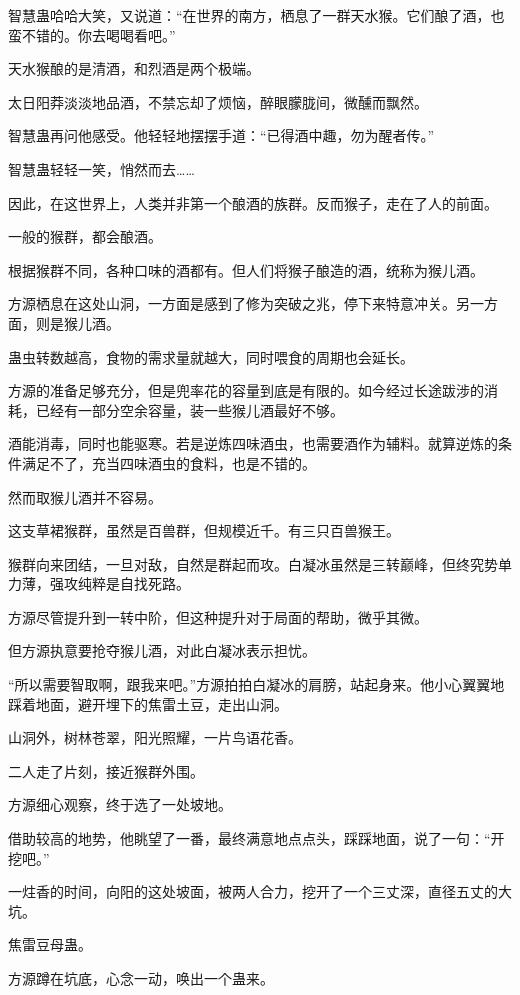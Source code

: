 \begin{this_body}
智慧蛊哈哈大笑，又说道：“在世界的南方，栖息了一群天水猴。它们酿了酒，也蛮不错的。你去喝喝看吧。”

天水猴酿的是清酒，和烈酒是两个极端。

太日阳莽淡淡地品酒，不禁忘却了烦恼，醉眼朦胧间，微醺而飘然。

智慧蛊再问他感受。他轻轻地摆摆手道：“已得酒中趣，勿为醒者传。”

智慧蛊轻轻一笑，悄然而去……

因此，在这世界上，人类并非第一个酿酒的族群。反而猴子，走在了人的前面。

一般的猴群，都会酿酒。

根据猴群不同，各种口味的酒都有。但人们将猴子酿造的酒，统称为猴儿酒。

方源栖息在这处山洞，一方面是感到了修为突破之兆，停下来特意冲关。另一方面，则是猴儿酒。

蛊虫转数越高，食物的需求量就越大，同时喂食的周期也会延长。

方源的准备足够充分，但是兜率花的容量到底是有限的。如今经过长途跋涉的消耗，已经有一部分空余容量，装一些猴儿酒最好不够。

酒能消毒，同时也能驱寒。若是逆炼四味酒虫，也需要酒作为辅料。就算逆炼的条件满足不了，充当四味酒虫的食料，也是不错的。

然而取猴儿酒并不容易。

这支草裙猴群，虽然是百兽群，但规模近千。有三只百兽猴王。

猴群向来团结，一旦对敌，自然是群起而攻。白凝冰虽然是三转巅峰，但终究势单力薄，强攻纯粹是自找死路。

方源尽管提升到一转中阶，但这种提升对于局面的帮助，微乎其微。

但方源执意要抢夺猴儿酒，对此白凝冰表示担忧。

“所以需要智取啊，跟我来吧。”方源拍拍白凝冰的肩膀，站起身来。他小心翼翼地踩着地面，避开埋下的焦雷土豆，走出山洞。

山洞外，树林苍翠，阳光照耀，一片鸟语花香。

二人走了片刻，接近猴群外围。

方源细心观察，终于选了一处坡地。

借助较高的地势，他眺望了一番，最终满意地点点头，踩踩地面，说了一句：“开挖吧。”

一炷香的时间，向阳的这处坡面，被两人合力，挖开了一个三丈深，直径五丈的大坑。

焦雷豆母蛊。

方源蹲在坑底，心念一动，唤出一个蛊来。


\end{this_body}
